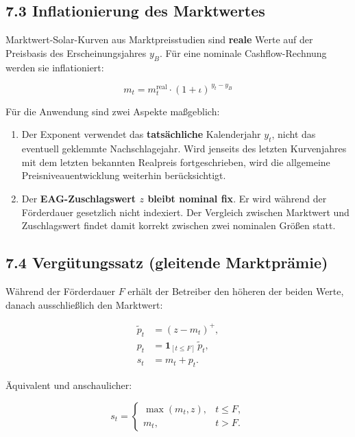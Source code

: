 \documentclass[
  a4paper,
  10pt]{article}
\providecommand{\tightlist}{%
  \setlength{\itemsep}{0pt}\setlength{\parskip}{0pt}}
\begin{document}
\hypertarget{inflationierung-des-marktwertes}{%
\subsection{7.3 Inflationierung des
Marktwertes}\label{inflationierung-des-marktwertes}}

Marktwert-Solar-Kurven aus Marktpreisstudien sind \textbf{reale} Werte
auf der Preisbasis des Erscheinungsjahres \(y_B\). Für eine nominale
Cashflow-Rechnung werden sie inflationiert:

\[ m_t = m^{\mathrm{real}}_t \cdot (1 + \iota)^{\,y_t - y_B} \]

Für die Anwendung sind zwei Aspekte maßgeblich:

\begin{enumerate}
\def\labelenumi{\arabic{enumi}.}
\tightlist
\item
  Der Exponent verwendet das \textbf{tatsächliche} Kalenderjahr \(y_t\),
  nicht das eventuell geklemmte Nachschlagejahr. Wird jenseits des
  letzten Kurvenjahres mit dem letzten bekannten Realpreis
  fortgeschrieben, wird die allgemeine Preisniveauentwicklung weiterhin
  berücksichtigt.
\item
  Der \textbf{EAG-Zuschlagswert \(z\) bleibt nominal fix}. Er wird
  während der Förderdauer gesetzlich nicht indexiert. Der Vergleich
  zwischen Marktwert und Zuschlagswert findet damit korrekt zwischen
  zwei nominalen Größen statt.
\end{enumerate}

\hypertarget{verguxfctungssatz-gleitende-marktpruxe4mie}{%
\subsection{7.4 Vergütungssatz (gleitende
Marktprämie)}\label{verguxfctungssatz-gleitende-marktpruxe4mie}}

Während der Förderdauer \(F\) erhält der Betreiber den höheren der
beiden Werte, danach ausschließlich den Marktwert:

\[
\begin{aligned}
\widetilde{p}_t &= \left(z-m_t\right)^+,\\
p_t &= \mathbf{1}_{[t\leq F]}\,\widetilde{p}_t,\\
s_t &= m_t+p_t.
\end{aligned}
\]

Äquivalent und anschaulicher:

\[
s_t=
\begin{cases}
\max(m_t,z), & t\leq F,\\
m_t, & t>F.
\end{cases}
\]
\end{document}
